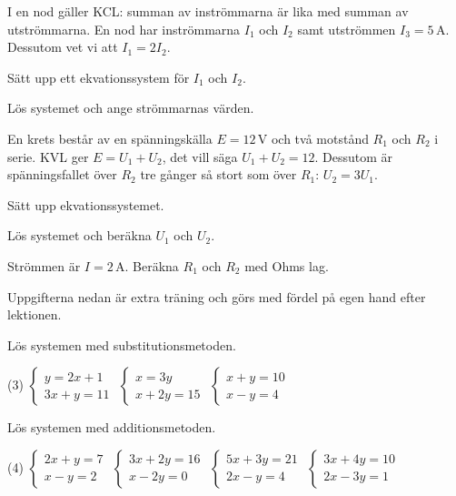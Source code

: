 I en nod gäller KCL: summan av inströmmarna är lika med summan av utströmmarna. En nod har
inströmmarna $I_1$ och $I_2$ samt utströmmen $I_3 = 5\,\text{A}$. Dessutom vet vi att
$I_1 = 2 I_2$.
\begin{parts}
  \item Sätt upp ett ekvationssystem för $I_1$ och $I_2$.
  \item Lös systemet och ange strömmarnas värden.
\end{parts}

En krets består av en spänningskälla $E = 12\,\text{V}$ och två motstånd $R_1$ och $R_2$ i serie.
KVL ger $E = U_1 + U_2$, det vill säga $U_1 + U_2 = 12$. Dessutom är spänningsfallet över $R_2$
tre gånger så stort som över $R_1$: $U_2 = 3 U_1$.
\begin{parts}
  \item Sätt upp ekvationssystemet.
  \item Lös systemet och beräkna $U_1$ och $U_2$.
  \item Strömmen är $I = 2\,\text{A}$. Beräkna $R_1$ och $R_2$ med Ohms lag.
\end{parts}

Uppgifterna nedan är extra träning och görs med fördel på egen hand efter lektionen.

Lös systemen med substitutionsmetoden.
\begin{delar}(3)
  \task $\begin{cases} y = 2x + 1 \\ 3x + y = 11 \end{cases}$
  \task $\begin{cases} x = 3y \\ x + 2y = 15 \end{cases}$
  \task $\begin{cases} x + y = 10 \\ x - y = 4 \end{cases}$
\end{delar}

Lös systemen med additionsmetoden.
\begin{delar}(4)
  \task $\begin{cases} 2x + y = 7 \\ x - y = 2 \end{cases}$
  \task $\begin{cases} 3x + 2y = 16 \\ x - 2y = 0 \end{cases}$
  \task $\begin{cases} 5x + 3y = 21 \\ 2x - y = 4 \end{cases}$
  \task $\begin{cases} 3x + 4y = 10 \\ 2x - 3y = 1 \end{cases}$
\end{delar}

